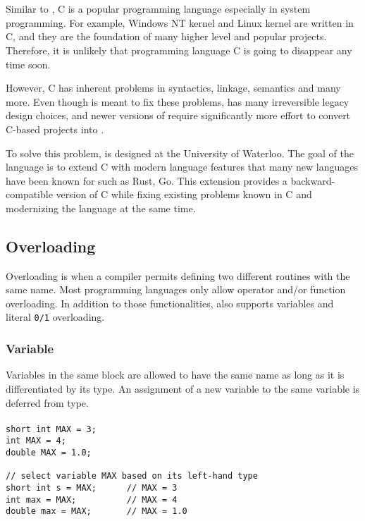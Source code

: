 \chapter{\CFA} \label{CFA}
Similar to \CC, C is a popular programming language especially in system
programming. For example, Windows NT kernel and Linux kernel are written in C, and they are the foundation of many higher level
and popular projects. Therefore, it is unlikely that programming language C is
going to disappear any time soon.

However, C has inherent problems in syntactics, linkage, semantics and many
more\cite{reference2}. Even though \CCS is meant to fix these problems, \CCS has many
irreversible legacy design choices, and newer versions of \CCS require significantly more effort to convert C-based projects into \CCS.

To solve this problem, \CFAS is designed at the University of Waterloo. The goal
of the language is to extend C with modern language features that many new
languages have been known for such as Rust, Go. This extension provides a
backward-compatible version of C while fixing existing problems known in C and
modernizing the language at the same time.

\section{Overloading}
Overloading is when a compiler permits defining two different routines with
the same name. Most programming languages only allow operator and/or function overloading.
In addition to those functionalities, \CFAS also supports variables and literal
\verb|0/1| overloading.

\subsection{Variable}
Variables in the same block are allowed to have the same name as long as it is
differentiated by its type. An assignment of a new variable to the same variable is
deferred from type.


\begin{frame}
\frametitle{}
\begin{lstlisting}[caption={Overloading variables in \CFA}, label={CFA-overload-var}]
short int MAX = 3;
int MAX = 4;
double MAX = 1.0;

// select variable MAX based on its left-hand type
short int s = MAX;      // MAX = 3
int max = MAX;          // MAX = 4
double max = MAX;       // MAX = 1.0
\end{lstlisting}
\end{frame}

